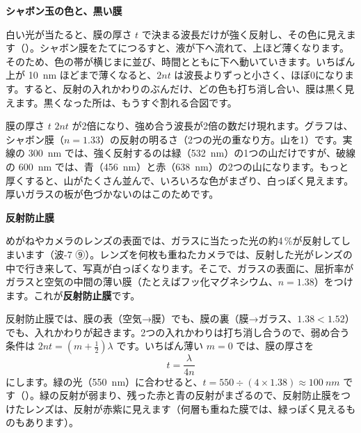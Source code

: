 \noindent\textbf{シャボン玉の色と、黒い膜}\par\nobreak
白い光が当たると、膜の厚さ $t$ で決まる波長だけが強く反射し、その色に見えます（\nobreak{}\nobreak）。シャボン膜をたてにつるすと、液が下へ流れて、上ほど薄くなります。そのため、色の帯が横じまに並び、時間とともに下へ動いていきます。いちばん上が \qty{10}{nm} ほどまで薄くなると、$2nt$ は波長よりずっと小さく、ほぼ0になります。すると、反射の入れかわりのぶんだけ、どの色も打ち消し合い、膜は黒く見えます。黒くなった所は、もうすぐ割れる合図です。

\begin{phbaisuru}{膜の厚さ $t$}
$2nt$ が2倍になり、強め合う波長が2倍の数だけ現れます。グラフは、シャボン膜（$n=1.33$）の反射の明るさ（2つの光の重なり方。山を1）です。実線の \qty{300}{nm} では、強く反射するのは緑（\qty{532}{nm}）の1つの山だけですが、破線の \qty{600}{nm} では、青（\qty{456}{nm}）と赤（\qty{638}{nm}）の2つの山になります。もっと厚くすると、山がたくさん並んで、いろいろな色がまざり、白っぽく見えます。厚いガラスの板が色づかないのはこのためです。
\par\vspace{2pt}\centering
{}
\end{phbaisuru}

\noindent\textbf{反射防止膜}\par\nobreak
めがねやカメラのレンズの表面では、ガラスに当たった光の約4\,\%が反射してしまいます（波-7 ⑨）。レンズを何枚も重ねたカメラでは、反射した光がレンズの中で行き来して、写真が白っぽくなります。そこで、ガラスの表面に、屈折率がガラスと空気の中間の薄い膜（たとえばフッ化マグネシウム、$n=1.38$）をつけます。これが\textbf{反射防止膜}です。

反射防止膜では、膜の表（空気→膜）でも、膜の裏（膜→ガラス、$1.38<1.52$）でも、入れかわりが起きます。2つの入れかわりは打ち消し合うので、弱め合う条件は $2nt=(m+\tfrac12)\lambda$ です。いちばん薄い $m=0$ では、膜の厚さを
\[ t=\frac{\lambda}{4n} \]
にします。緑の光（\qty{550}{nm}）に合わせると、$t=550\div(4\times1.38)\approx\qty{100}{nm}$ です（\nobreak{}\nobreak）。緑の反射が弱まり、残った赤と青の反射がまざるので、反射防止膜をつけたレンズは、反射が赤紫に見えます（何層も重ねた膜では、緑っぽく見えるものもあります）。

